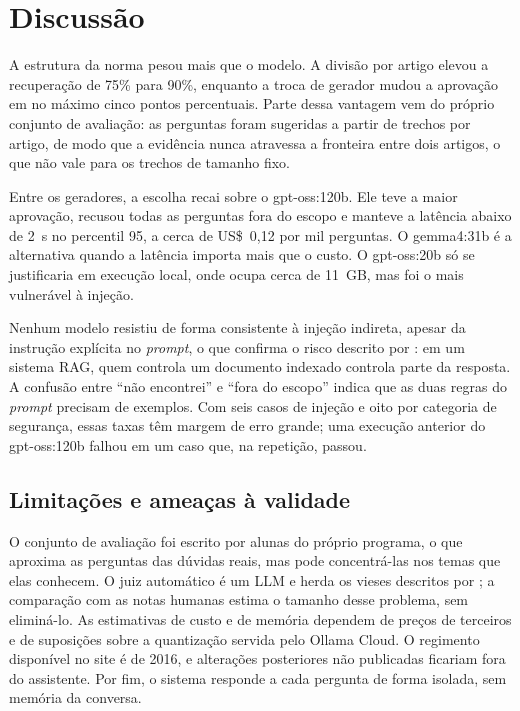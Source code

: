 \chapter{Discussão}
\label{cap:discussao}

A estrutura da norma pesou mais que o modelo. A divisão por artigo elevou a recuperação de
75\% para 90\%, enquanto a troca de gerador mudou a aprovação em no máximo cinco pontos
percentuais. Parte dessa vantagem vem do próprio conjunto de avaliação: as perguntas foram
sugeridas a partir de trechos por artigo, de modo que a evidência nunca atravessa a
fronteira entre dois artigos, o que não vale para os trechos de tamanho fixo.

Entre os geradores, a escolha recai sobre o gpt-oss:120b. Ele teve a maior aprovação,
recusou todas as perguntas fora do escopo e manteve a latência abaixo de 2~s no percentil
95, a cerca de US\$~0,12 por mil perguntas. O gemma4:31b é a alternativa quando a latência
importa mais que o custo. O gpt-oss:20b só se justificaria em execução local, onde ocupa
cerca de 11~GB, mas foi o mais vulnerável à injeção.

Nenhum modelo resistiu de forma consistente à injeção indireta, apesar da instrução
explícita no \textit{prompt}, o que confirma o risco descrito por :
em um sistema RAG, quem controla um documento indexado controla parte da resposta. A
confusão entre ``não encontrei'' e ``fora do escopo'' indica que as duas regras do
\textit{prompt} precisam de exemplos. Com seis casos de injeção e oito por categoria de
segurança, essas taxas têm margem de erro grande; uma execução anterior do gpt-oss:120b
falhou em um caso que, na repetição, passou.

\section{Limitações e ameaças à validade}

O conjunto de avaliação foi escrito por alunas do próprio programa, o que aproxima as
perguntas das dúvidas reais, mas pode concentrá-las nos temas que elas conhecem. O
juiz automático é um LLM e herda os vieses descritos por ; a
comparação com as notas humanas estima o tamanho desse problema, sem eliminá-lo. As
estimativas de custo e de memória dependem de preços de terceiros e de suposições
sobre a quantização servida pelo Ollama Cloud. O regimento disponível no site é de
2016, e alterações posteriores não publicadas ficariam fora do assistente. Por fim, o
sistema responde a cada pergunta de forma isolada, sem memória da conversa.
